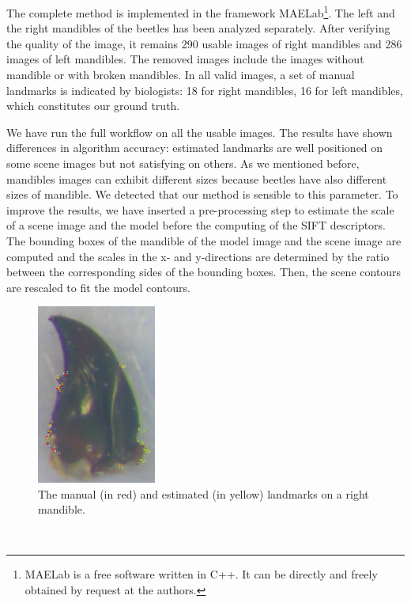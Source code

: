 \documentclass[twoside,twocolumn,10pt]{article}
\begin{document}
The complete method is implemented in the framework MAELab\footnote{MAELab
  is a free software written in C++. It can be directly and freely obtained by request
  at the authors.}. The left and the right mandibles of the beetles has been analyzed separately.
After verifying the quality of the image, it remains 290 usable images of right mandibles and 286 images of left mandibles.
The removed images include the images without mandible or with broken mandibles.
In all valid images, a set of manual landmarks is indicated by
biologists: 18 for right mandibles, 16 for left mandibles, which
constitutes our ground truth.

We have run the full workflow on all the usable images.
The results have shown differences in algorithm accuracy: estimated
landmarks are well positioned on some scene images but not satisfying
on others. As we mentioned before, mandibles images can exhibit
different sizes because beetles have also different sizes of
mandible. We detected that our method is sensible to this parameter.
To improve the results, we have inserted a pre-processing step to
estimate the scale of a scene image and the model before the
computing of the SIFT descriptors. The bounding boxes of the mandible
of the model image and the scene image are computed and the scales in the x-
and y-directions are determined by the ratio between the corresponding
sides of the bounding boxes. Then, the scene contours are rescaled to fit the model contours. \\
\begin{figure}[htbp]
\centering
\includegraphics[width=0.35\textwidth]{./images/md_rs}
\caption{The manual (in red) and estimated (in yellow) landmarks on a right mandible.}
\label{figresult}
\end{figure}~\\
\end{document}
